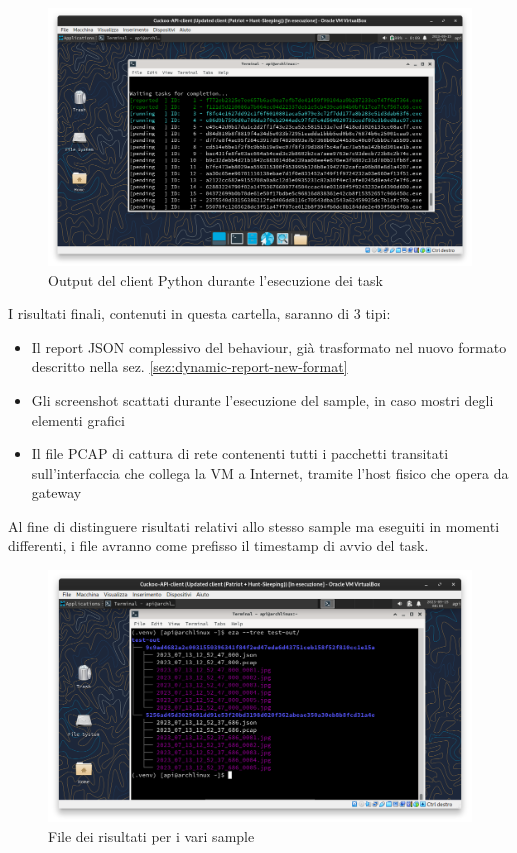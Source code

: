 \begin{figure}[htbp]
    \centering
    \includegraphics[width=\textwidth]{assets/dynamic-api-client-running.png}
    \caption{Output del client Python durante l'esecuzione dei task}
    \label{fig:dynamic-api-client-running}
\end{figure}

I risultati finali, contenuti in questa cartella, saranno di 3 tipi:
\begin{itemize}
    \item Il report JSON complessivo del behaviour, già trasformato nel nuovo formato descritto nella sez. \ref{sez:dynamic-report-new-format}
    \item Gli screenshot scattati durante l'esecuzione del sample, in caso mostri degli elementi grafici
    \item Il file PCAP di cattura di rete contenenti tutti i pacchetti transitati sull'interfaccia che collega la VM a Internet, tramite l'host fisico che opera da gateway
\end{itemize}

Al fine di distinguere risultati relativi allo stesso sample ma eseguiti in momenti differenti, i file avranno come prefisso il timestamp di avvio del task.

\begin{figure}[htbp]
    \centering
    \includegraphics[width=\textwidth]{assets/dynamic-api-results.png}
    \caption{File dei risultati per i vari sample}
    \label{fig:dynamic-api-results}
\end{figure}
